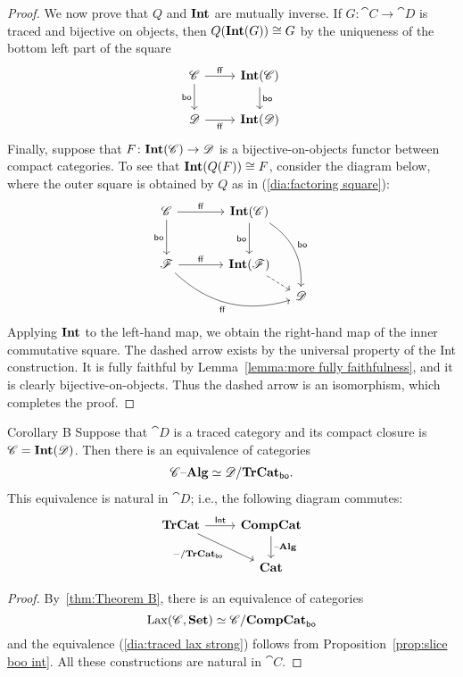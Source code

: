 \documentclass[12pt,oneside,article,draft]{memoir}
\begin{document}
\begin{proof}
	We now prove that $Q$ and $\mathbf{Int}$ are mutually inverse.
	If $G\colon\cat{C}\to\cat{D}$ is traced and bijective on objects, then $Q(\mathbf{Int}(G))\cong G$ by the uniqueness of the bottom left part of the square
	$$
	\begin{tikzcd}
	\cat{C}\arrow[r,"\ff"]\arrow[d,"\bo"']&\Int(\cat{C})\arrow[d,"\bo"]\\
	\cat{D}\arrow[r,"\ff"']&\Int(\cat{D})
	\end{tikzcd}
	$$
	Finally, suppose that $F\colon\mathbf{Int}(\mathscr{C})\to\mathscr{D}$ is a bijective-on-objects functor between compact categories.
	To see that $\mathbf{Int}(Q(F))\cong F$, consider the diagram below, where the outer square is obtained by $Q$ as in (\ref{dia:factoring square}):
	$$
	\begin{tikzcd}[column sep=small, row sep=small]
		\cat{C}\arrow[rr,"\ff"]\arrow[dd,"\bo"']
			&~
			&\Int(\cat{C})\arrow[dd,"\bo"']\arrow[dddr,bend left,"\bo"] \\
		~ \\
		\cat{F}\arrow[rr,"\ff"]\arrow[drrr,bend right, "\ff"']
			&&\Int(\cat{F})\arrow[dr,dashed] \\
		&&&\cat{D}
	\end{tikzcd}
	$$
	Applying $\mathbf{Int}$ to the left-hand map, we obtain the right-hand map of the inner commutative square.
	The dashed arrow exists by the universal property of the Int construction.
	It is fully faithful by Lemma~\ref{lemma:more fully faithfulness}, and it is clearly bijective-on-objects.
	Thus the dashed arrow is an isomorphism, which completes the proof.
\end{proof}

\begin{named}{Corollary B}\label{cor:Corollary B}
	Suppose that $\cat{D}$ is a traced category and its compact closure is $\mathscr{C}=\mathbf{Int}(\mathscr{D})$.
	Then there is an equivalence of categories
	\begin{align}\label{dia:traced lax strong}
		\mathscr{C}{\text \textendash}\mathbf{Alg}\simeq\mathscr{D}/\mathbf{TrCat}_{\mathsf{bo}}.
	\end{align}
	This equivalence is natural in $\cat{D}$; i.e., the following diagram commutes:
	\begin{equation*}
	\begin{tikzcd}
		\TrCat\ar[r,"\Fun{Int}"]\ar[dr,"-/\TrCat_{\bo}"']
			&\CompCat\ar[d,"\alg"] \\
		&\Cat
	\end{tikzcd}
	\end{equation*}
\end{named}
\begin{proof}
	By~\ref{thm:Theorem B}, there is an equivalence of categories
		$$\operatorname{Lax}(\mathscr{C},\mathbf{Set})\simeq\mathscr{C}/\mathbf{CompCat}_{\mathsf{bo}}$$
	and the equivalence (\ref{dia:traced lax strong}) follows from Proposition~\ref{prop:slice boo int}.
	All these constructions are natural in $\cat{C}$.
\end{proof}
\end{document}
